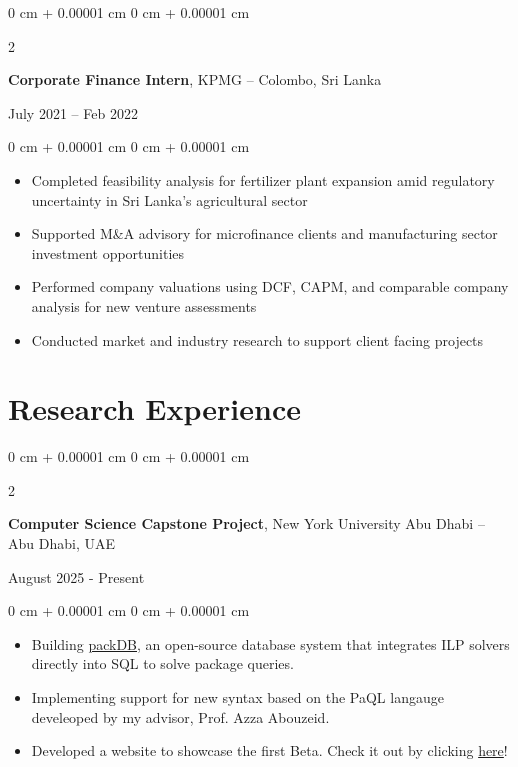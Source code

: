 \documentclass[10 pt,letterpaper]{article}
\newenvironment{highlights}{
    \begin{itemize}[
        topsep=0.10 cm,
        parsep=0.10 cm,
        partopsep=0pt,
        itemsep=0pt,
        leftmargin=0 cm + 10pt
    ]
}{
    \end{itemize}
} %
\newenvironment{onecolentry}{
    \begin{adjustwidth}{
        0 cm + 0.00001 cm
    }{
        0 cm + 0.00001 cm
    }
}{
    \end{adjustwidth}
} %
\newenvironment{twocolentry}[2][]{
    \onecolentry
    \def\secondColumn{#2}
    \setcolumnwidth{\fill, 4.5 cm}
    \begin{paracol}{2}
}{
    \switchcolumn \raggedleft \secondColumn
    \end{paracol}
    \endonecolentry
} %
\begin{document}
        \vspace{0.10 cm}
        \begin{twocolentry}
            {July 2021 – Feb 2022}
            \textbf{Corporate Finance Intern}, KPMG -- Colombo, Sri Lanka
        \end{twocolentry}
        \vspace{0.1 cm}
        \begin{onecolentry}
            \begin{highlights}
                \item Completed feasibility analysis for fertilizer plant expansion amid regulatory uncertainty in Sri Lanka's agricultural sector
                \item Supported M\&A advisory for microfinance clients and manufacturing sector investment opportunities
                \item Performed company valuations using DCF, CAPM, and comparable company analysis for new venture assessments
                \item Conducted market and industry research to support client facing projects
            \end{highlights}
        \end{onecolentry}


    
    \section{Research Experience}


        \begin{twocolentry}{
            August 2025 - Present
        }
            \textbf{Computer Science Capstone Project}, New York University Abu Dhabi -- Abu Dhabi, UAE
        \end{twocolentry}

        \vspace{0.1 cm}
        \begin{onecolentry}
            \begin{highlights}
                \item Building \href{https://huda-lab.github.io/packdb/index.html}{packDB}, an open-source database system that integrates ILP solvers directly into SQL to solve package queries.
                \item Implementing support for new syntax based on the PaQL langauge develeoped by my advisor, Prof. Azza Abouzeid.
                \item Developed a website to showcase the first Beta. Check it out by clicking \href{https://huda-lab.github.io/packdb/getting-started.html}{here}!
            \end{highlights}
        \end{onecolentry}
\end{document}
